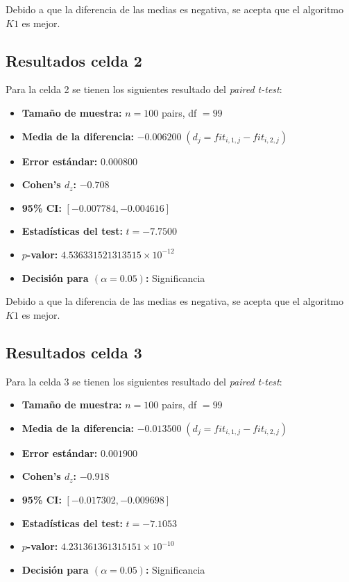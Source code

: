 Debido a que la diferencia de las medias es negativa, se acepta que el algoritmo $K1$ es mejor.

\subsection{Resultados celda 2}
Para la celda 2 se tienen los siguientes resultado del \textit{paired t-test}:
\begin{itemize}
    \item \textbf{Tamaño de muestra:} $n=100$ pairs, df $=99$
    \item \textbf{Media de la diferencia:} $-0.006200 \; (d_j = fit_{i,1,j} - fit_{i,2,j})$
    \item \textbf{Error estándar:} $0.000800$
    \item \textbf{Cohen's $d_z$:} $-0.708$
    \item \textbf{95\% CI:} $[-0.007784, -0.004616]$
    \item \textbf{Estadísticas del test:} $t = -7.7500$
    \item \textbf{$p$-valor:} $4.536331521313515 \times 10^{-12}$
    \item \textbf{Decisión para $(\alpha = 0.05)$:} Significancia
\end{itemize}

Debido a que la diferencia de las medias es negativa, se acepta que el algoritmo $K1$ es mejor.

\subsection{Resultados celda 3}
Para la celda 3 se tienen los siguientes resultado del \textit{paired t-test}:
\begin{itemize}
    \item \textbf{Tamaño de muestra:} $n=100$ pairs, df $=99$
    \item \textbf{Media de la diferencia:} $-0.013500 \; (d_j = fit_{i,1,j} - fit_{i,2,j})$
    \item \textbf{Error estándar:} $0.001900$
    \item \textbf{Cohen's $d_z$:} $-0.918$
    \item \textbf{95\% CI:} $[-0.017302, -0.009698]$
    \item \textbf{Estadísticas del test:} $t = -7.1053$
    \item \textbf{$p$-valor:} $4.231361361315151 \times 10^{-10}$
    \item \textbf{Decisión para $(\alpha = 0.05)$:} Significancia
\end{itemize}

